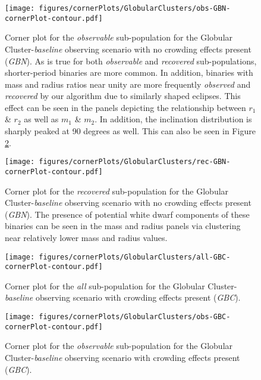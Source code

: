 \documentclass[twocolumn]{aastex63}
\begin{document}
\begin{figure}
    \centering
    \texttt{[image: figures/cornerPlots/GlobularClusters/obs-GBN-cornerPlot-contour.pdf]}
    \caption{Corner plot for the \textit{observable} sub-population for the Globular Cluster-\textit{baseline} observing scenario with no crowding effects present (\textit{GBN}). As is true for both \textit{observable} and \textit{recovered} sub-populations, shorter-period binaries are more common. In addition, binaries with mass and radius ratios near unity are more frequently \textit{observed} and \textit{recovered} by our algorithm due to similarly shaped eclipses. This effect can be seen in the panels depicting the relationship between $r_1$ \& $r_2$ as well as $m_1$ \& $m_2$. In addition, the inclination distribution is sharply peaked at 90 degrees as well. This can also be seen in Figure \ref{fig:gbn-corner-plot-appendix}.}
    \label{fig:gbn-corner-plot-appendix}
\end{figure}\clearpage

\begin{figure}
    \centering
    \texttt{[image: figures/cornerPlots/GlobularClusters/rec-GBN-cornerPlot-contour.pdf]}
    \caption{Corner plot for the \textit{recovered} sub-population for the Globular Cluster-\textit{baseline} observing scenario with no crowding effects present (\textit{GBN}). The presence of potential white dwarf components of these binaries can be seen in the mass and radius panels via clustering near relatively lower mass and radius values.}
    \label{fig:gbn-corner-plot-appendix}
\end{figure}\clearpage

\begin{figure}
    \centering
    \texttt{[image: figures/cornerPlots/GlobularClusters/all-GBC-cornerPlot-contour.pdf]}
    \caption{Corner plot for the \textit{all} sub-population for the Globular Cluster-\textit{baseline} observing scenario with crowding effects present (\textit{GBC}).}
    \label{fig:gbc-corner-plot-appendix}
\end{figure}\clearpage

\begin{figure}
    \centering
    \texttt{[image: figures/cornerPlots/GlobularClusters/obs-GBC-cornerPlot-contour.pdf]}
    \caption{Corner plot for the \textit{observable} sub-population for the Globular Cluster-\textit{baseline} observing scenario with crowding effects present (\textit{GBC}).}
    \label{fig:gbc-obs-corner-plot-appendix}
\end{figure}\clearpage
\end{document}
